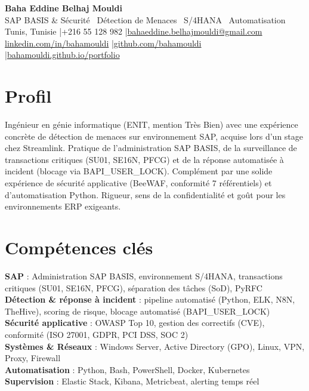 \documentclass[a4paper,9pt]{article}
\begin{document}
\begin{center}
{\LARGE\bfseries\color{navy} Baha Eddine Belhaj Mouldi}\\[2pt]
{\normalsize\color{navy} SAP BASIS \& Sécurité \textbar\ Détection de Menaces \textbar\ S/4HANA \textbar\ Automatisation}\\[3pt]
{\small Tunis, Tunisie \quad|\quad +216 55 128 982 \quad|\quad \href{mailto:bahaeddine.belhajmouldi@gmail.com}{bahaeddine.belhajmouldi@gmail.com}}\\[1pt]
{\small \href{https://www.linkedin.com/in/bahamouldi}{linkedin.com/in/bahamouldi} \quad|\quad \href{https://github.com/bahamouldi}{github.com/bahamouldi} \quad|\quad \href{https://bahamouldi.github.io/portfolio/}{bahamouldi.github.io/portfolio}}
\end{center}
\vspace{1pt}
\section{Profil}
Ingénieur en génie informatique (ENIT, mention Très Bien) avec une expérience concrète de détection de menaces sur environnement SAP, acquise lors d'un stage chez Streamlink. Pratique de l'administration SAP BASIS, de la surveillance de transactions critiques (SU01, SE16N, PFCG) et de la réponse automatisée à incident (blocage via BAPI\_USER\_LOCK). Complément par une solide expérience de sécurité applicative (BeeWAF, conformité 7 référentiels) et d'automatisation Python. Rigueur, sens de la confidentialité et goût pour les environnements ERP exigeants.
\section{Compétences clés}
\textbf{SAP} : Administration SAP BASIS, environnement S/4HANA, transactions critiques (SU01, SE16N, PFCG), séparation des tâches (SoD), PyRFC\\[0.3pt]
\textbf{Détection \& réponse à incident} : pipeline automatisé (Python, ELK, N8N, TheHive), scoring de risque, blocage automatisé (BAPI\_USER\_LOCK)\\[0.3pt]
\textbf{Sécurité applicative} : OWASP Top 10, gestion des correctifs (CVE), conformité (ISO 27001, GDPR, PCI DSS, SOC 2)\\[0.3pt]
\textbf{Systèmes \& Réseaux} : Windows Server, Active Directory (GPO), Linux, VPN, Proxy, Firewall\\[0.3pt]
\textbf{Automatisation} : Python, Bash, PowerShell, Docker, Kubernetes\\[0.3pt]
\textbf{Supervision} : Elastic Stack, Kibana, Metricbeat, alerting temps réel
\end{document}
